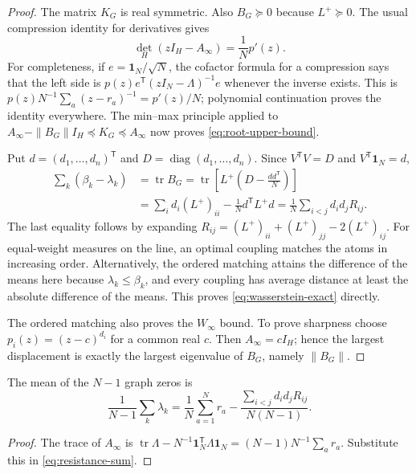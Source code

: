 \begin{proof}
The matrix $K_G$ is real symmetric.  Also $B_G\succeq0$ because
$L^+\succeq0$.  The usual compression identity for derivatives gives
\begin{equation}\label{eq:differentiator}
 \det_H(zI_H-A_\infty)=\frac1N p'(z).
\end{equation}
For completeness, if $e=\boldsymbol1_N/\sqrt N$, the cofactor formula
for a compression says that the left side is
$p(z)e^{\mathsf T}(zI_N-\Lambda)^{-1}e$ whenever the inverse exists.
This is $p(z)N^{-1}\sum_a(z-r_a)^{-1}=p'(z)/N$; polynomial
continuation proves the identity everywhere.  The min--max principle
applied to
$A_\infty-\|B_G\|I_H\preceq K_G\preceq A_\infty$
now proves \eqref{eq:root-upper-bound}.

Put $d=(d_1,\ldots,d_n)^{\mathsf T}$ and
$D=\operatorname{diag}(d_1,\ldots,d_n)$.  Since
$V^{\mathsf T}V=D$ and $V^{\mathsf T}\boldsymbol1_N=d$,
\begin{align*}
 \sum_k(\beta_k-\lambda_k)
 &=\operatorname{tr}B_G
 =\operatorname{tr}\left[L^+\left(D-\frac{dd^{\mathsf T}}N\right)\right]\\
 &=\sum_i d_i(L^+)_{ii}-\frac1N d^{\mathsf T}L^+d
 =\frac1N\sum_{i<j}d_i d_jR_{ij}.
\end{align*}
The last equality follows by expanding
$R_{ij}=(L^+)_{ii}+(L^+)_{jj}-2(L^+)_{ij}$.
For equal-weight measures on the line, an optimal coupling matches
the atoms in increasing order.  Alternatively, the ordered matching
attains the difference of the means here because
$\lambda_k\leq\beta_k$, and every coupling has average distance at
least the absolute difference of the means.  This proves
\eqref{eq:wasserstein-exact} directly.

The ordered matching also proves the $W_\infty$ bound.  To prove
sharpness choose $p_i(z)=(z-c)^{d_i}$ for a common real $c$.
Then $A_\infty=cI_H$; hence the largest displacement is exactly
the largest eigenvalue of $B_G$, namely $\|B_G\|$.
\end{proof}

\begin{corollary}\label{cor:barycentre}
The mean of the $N-1$ graph zeros is
\begin{equation}\label{eq:barycentre}
 \frac1{N-1}\sum_k\lambda_k
  =\frac1N\sum_{a=1}^N r_a
   -\frac{\sum_{i<j}d_i d_jR_{ij}}{N(N-1)}.
\end{equation}
\end{corollary}
\begin{proof}
The trace of $A_\infty$ is
$\operatorname{tr}\Lambda-N^{-1}\boldsymbol1_N^{\mathsf T}\Lambda\boldsymbol1_N
=(N-1)N^{-1}\sum_a r_a$.  Substitute this in
\eqref{eq:resistance-sum}.
\end{proof}

